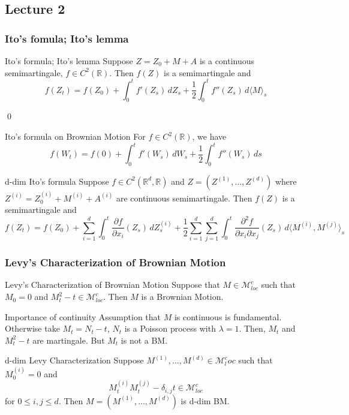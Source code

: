 \documentclass[12pt,a4paper]{article}
\newcommand{\R}{\mathbb{R}}
\renewenvironment{proof}
    {\begin{trivlist}\item[\hskip\labelsep\color{blue}\bfseries Proof:]}
    {\qed\end{trivlist}}
\begin{document}
\subsection{Lecture 2}
\subsubsection{Ito's fomula; Ito's lemma}
\begin{theorem}{Ito's formula; Ito's lemma}{}
    Suppose $Z = Z_0 + M+A$ is a continuous semimartingale, $f\in C^2(\R)$. Then $f(Z)$ is a semimartingale and
    \begin{equation*}
        f(Z_t) = f(Z_0) + \int_0^t f'(Z_s)\, dZ_s + \frac{1}{2}\int_0^t f''(Z_s)\,d\langle M\rangle_s \tag{$*$}
    \end{equation*}
\end{theorem}
\begin{proof}
    
\end{proof}
\begin{corollary}{Ito's formula on Brownian Motion}{}
    For $f\in C^2(\R)$, we have
    $$
    f(W_t) = f(0) + \int_0^t f'(W_s)\, dW_s+ \frac{1}{2}\int_0^t f''(W_s)\, ds
    $$
\end{corollary}
\begin{theorem}{d-dim Ito's formula}
    Suppose $f\in C^2(\R^d,\R)$ and $Z = \left(Z^{(1)},\ldots, Z^{(d)}\right)$ where $Z^{(i)} = Z_0^{(i)} + M^{(i)} + A^{(i)}$ are continuous semimartingale. Then $f(Z)$ is a semimartingale and
    $$
    f(Z_t) = f(Z_0)+\sum_{i=1}^d \int_0^t \frac{\partial f}{\partial x_i}(Z_s)\,dZ_s^{(i)}+\frac{1}{2}\sum_{i=1}^d\sum_{j=1}^d \int_0^t \frac{\partial^2 f}{\partial x_i\partial x_j} (Z_s)\,d\langle M^{(i)},M^{(j)}\rangle_s
    $$
\end{theorem}
\pagebreak
\subsubsection{Levy's Characterization of Brownian Motion}
\begin{theorem}{Levy's Characterization of Brownian Motion}{}
    Suppose that $M\in\mathcal{M}^c_{loc}$ such that $M_0=0$ and $M_t^2-t\in \mathcal{M}^c_{loc}$. Then $M$ is a Brownian Motion.
\end{theorem}
\begin{remark}{Importance of continuity}{}
    Assumption that $M$ is continuous is fundamental. Otherwise take $M_t = N_t-t$, $N_t$ is a Poisson process with $\lambda=1$. Then, $M_t$ and $M_t^2-t$ are martingale. But $M_t$ is not a BM.
\end{remark}
\begin{theorem}{d-dim Levy Characterization}{}
    Suppose $M^{(1)}, \ldots, M^{(d)}\in\mathcal{M}^c_loc$ such that $M_0^{(i)}=0$ and
    $$
    M_t^{(i)}M_{t}^{(j)}-\delta_{i,j}t\in \mathcal{M}^c_{loc}
    $$
    for $0\le i,j\le d$. Then $M= (M^{(1)},\ldots, M^{(d)})$ is d-dim BM.
\end{theorem}
\pagebreak
\end{document}
